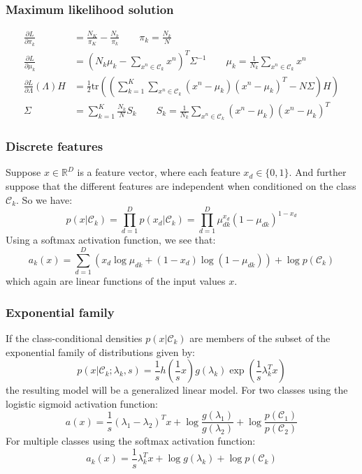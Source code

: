 \documentclass{beamer}
\begin{document}
\begin{frame}
    \frametitle{Maximum likelihood solution}
    \begin{align*}
        \frac{\partial{}L}{\partial\pi_{k}}&=\frac{N_{K}}{\pi_{K}}-\frac{N_{k}}{\pi_{k}}\qquad\pi_{k}=\frac{N_{k}}{N} \\
        \frac{\partial{}L}{\partial\mu_{k}}&=(N_{k}\mu_{k}-\sum_{x^{n}\in\mathcal{C}_{k}}x^{n})^{T}\Sigma^{-1}\qquad\mu_{k}=\frac{1}{N_{k}}\sum_{x^{n}\in\mathcal{C}_{k}}x^{n} \\
        \frac{\partial{}L}{\partial\Lambda}(\Lambda)H&=\frac{1}{2}\mathrm{tr}((\sum_{k=1}^{K}\sum_{x^{n}\in\mathcal{C}_{k}}(x^{n}-\mu_{k})(x^{n}-\mu_{k})^{T}-N\Sigma)H) \\
        \Sigma&=\sum_{k=1}^{K}\frac{N_{k}}{N}S_{k}\qquad{}S_{k}=\frac{1}{N_{k}}\sum_{x^{n}\in\mathcal{C}_{k}}(x^{n}-\mu_{k})(x^{n}-\mu_{k})^{T}
    \end{align*}
\end{frame}

\begin{frame}
    \frametitle{Discrete features}
    Suppose $x\in\mathbb{R}^{D}$ is a feature vector, where each feature $x_{d}\in\{0,1\}$. And further suppose that the different features are independent when conditioned on the class $\mathcal{C}_{k}$. So we have:
    \begin{equation*}
        p(x|\mathcal{C}_{k})=\prod_{d=1}^{D}p(x_{d}|\mathcal{C}_{k})=\prod_{d=1}^{D}\mu_{dk}^{x_{d}}(1-\mu_{dk})^{1-x_{d}}
    \end{equation*}
    Using a softmax activation function, we see that:
    \begin{equation*}
        a_{k}(x)=\sum_{d=1}^{D}(x_{d}\log\mu_{dk}+(1-x_{d})\log(1-\mu_{dk}))+\log{}p(\mathcal{C}_{k})
    \end{equation*}
    which again are linear functions of the input values $x$.
\end{frame}

\begin{frame}
    \frametitle{Exponential family}
    If the class-conditional densities $p(x|\mathcal{C}_{k})$ are members of the subset of the exponential family of distributions given by:
    \begin{equation*}
        p(x|\mathcal{C}_{k};\lambda_{k},s)=\frac{1}{s}h(\frac{1}{s}x)g(\lambda_{k})\exp(\frac{1}{s}\lambda_{k}^{T}x)
    \end{equation*}
    the resulting model will be a generalized linear model. For two classes using the logistic sigmoid activation function:
    \begin{equation*}
        a(x)=\frac{1}{s}(\lambda_{1}-\lambda_{2})^{T}x+\log\frac{g(\lambda_{1})}{g(\lambda_{2})}+\log\frac{p(\mathcal{C}_{1})}{p(\mathcal{C}_{2})}
    \end{equation*}
    For multiple classes using the softmax activation function:
    \begin{equation*}
        a_{k}(x)=\frac{1}{s}\lambda_{k}^{T}x+\log{}g(\lambda_{k})+\log{}p(\mathcal{C}_{k})
    \end{equation*}
\end{frame}
\end{document}
